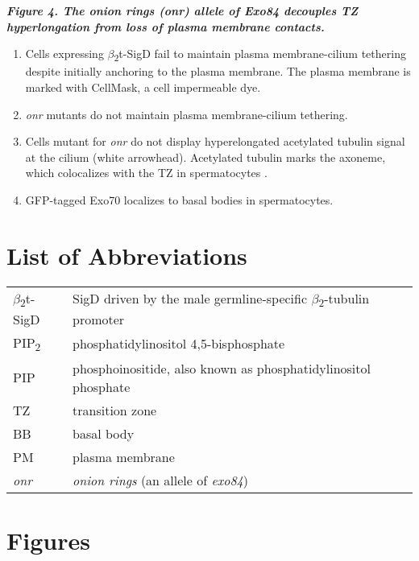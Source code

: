 \documentclass[12pt, twoside, letterpaper]{article}
\newcommand{\PIP}{PIP\textsubscript{2}}
\newcommand{\sigd}{$\beta$\textsubscript{2}t-SigD}
\begin{document}
\begin{doublespacing}
\begin{linenumbers}
    \bigskip
    \textbf{\itshape Figure 4. The \textit{onion rings} (\textit{onr}) allele of Exo84 decouples TZ hyperlongation from loss of plasma membrane contacts.}
    \begin{enumerate}[label={(\Alph*)}, nolistsep]
    \item Cells expressing \sigd{} fail to maintain plasma membrane-cilium tethering despite initially anchoring to the plasma membrane.
      The plasma membrane is marked with CellMask, a cell impermeable dye.
    \item \textit{onr} mutants do not maintain plasma membrane-cilium tethering.
    \item Cells mutant for \textit{onr} do not display hyperelongated acetylated tubulin signal at the cilium (white arrowhead).
      Acetylated tubulin marks the axoneme, which colocalizes with the TZ in spermatocytes \citep{pratt2016drosophila}.
    \item GFP-tagged Exo70 localizes to basal bodies in spermatocytes.
    \end{enumerate}
    
  \end{linenumbers}


    \section*{List of Abbreviations}
    \begin{tabular}{ll}
       \sigd{} & SigD driven by the male germline-specific $\beta$\textsubscript{2}-tubulin promoter \\
       \PIP{} & phosphatidylinositol 4,5-bisphosphate \\
      PIP & phosphoinositide, also known as phosphatidylinositol phosphate \\
       TZ & transition zone \\
       BB & basal body \\
       PM & plasma membrane \\ 
       \textit{onr} & \textit{onion rings} (an allele of \textit{exo84})
    \end{tabular}
\end{doublespacing}



\newpage

\section*{Figures}
\end{document}
